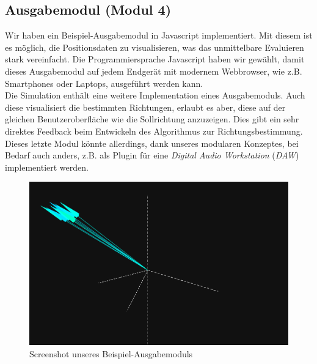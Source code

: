 \subsection{Ausgabemodul (Modul 4)}
Wir haben ein Beispiel-Ausgabemodul in Javascript implementiert. Mit diesem ist es möglich, die Positionsdaten zu visualisieren, was das unmittelbare Evaluieren stark vereinfacht. Die Programmiersprache Javascript haben wir gewählt, damit dieses Ausgabemodul auf jedem Endgerät mit modernem Webbrowser, wie z.B. Smartphones oder Laptops, ausgeführt werden kann.\\
Die Simulation enthält eine weitere Implementation eines Ausgabemoduls. Auch diese visualisiert die bestimmten Richtungen, erlaubt es aber, diese auf der gleichen Benutzeroberfläche wie die Sollrichtung anzuzeigen. Dies gibt ein sehr direktes Feedback beim Entwickeln des Algorithmus zur Richtungsbestimmung. Dieses letzte Modul könnte allerdings, dank unseres modularen Konzeptes, bei Bedarf auch anders, z.B. als Plugin für eine \textit{Digital Audio Workstation} (\textit{DAW}) implementiert werden.
\begin{figure}[H]
  \centering
  \includegraphics[width=\textwidth]{img/soundLocateViewer.png}
  \caption{Screenshot unseres Beispiel-Ausgabemoduls}
  \label{fig:output}
\end{figure}
